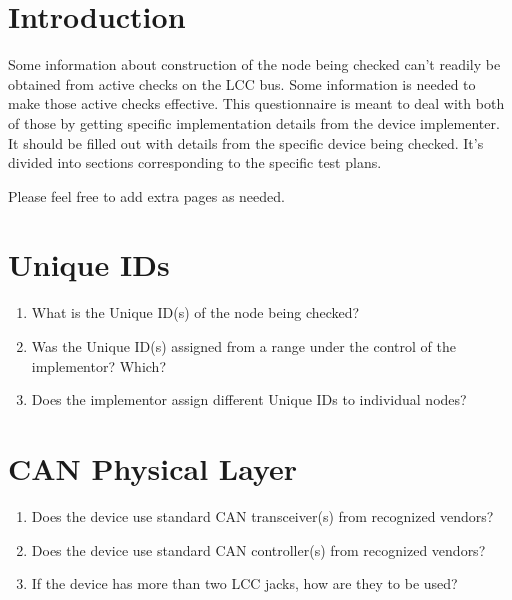 



\maketitle
\thispagestyle{firststyle}

\section{Introduction}

Some information about construction of the node being checked can't readily be obtained
from active checks on the LCC bus. Some information is needed to make those active 
checks effective.  This questionnaire is meant to deal with both of those
by getting specific implementation details from the device implementer.
It should be filled out with details from the specific device being checked.
It's divided into sections corresponding to the specific test plans.

Please feel free to add extra pages as needed.

\section{Unique IDs}
\begin{enumerate}
    \item What is the Unique ID(s) of the node being checked?
    \item Was the Unique ID(s) assigned from a range under the control of the implementor? Which?
    \item Does the implementor assign different Unique IDs to individual nodes?
\end{enumerate}

\section{CAN Physical Layer}
\begin{enumerate}
    \item Does the device use standard CAN transceiver(s) from recognized vendors?
    \item Does the device use standard CAN controller(s) from recognized vendors?
    \item If the device has more than two LCC jacks, how are they to be used?
\end{enumerate}

